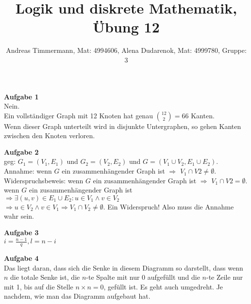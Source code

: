 \documentclass[a4paper]{scrartcl}
\title{Logik und diskrete Mathematik, Übung 12}
\author{Andreas Timmermann, Mat: 4994606, Alena Dudarenok, Mat: 4999780, Gruppe: 3}
\begin{document}
	\maketitle
	\begin{flushleft}
		\textbf{Aufgabe 1}\\
		Nein.\\
		Ein vollständiger Graph mit 12 Knoten hat genau $\binom{12}{2}=66$ Kanten.\\
		Wenn dieser Graph unterteilt wird in disjunkte Untergraphen, so gehen Kanten zwischen den Knoten verloren.\\
	\end{flushleft}
	\begin{flushleft}
		\textbf{Aufgabe 2}\\
		geg: $G_1=(V_1,E_1)$ und $G_2=(V_2,E_2)$ und $G=(V_1\cup V_2,E_1\cup E_2)$.\\
		Annahme: wenn $G$ ein zusammenhängender Graph ist $\Rightarrow$ $V_1\cap V2\neq \emptyset$.\\[1em]
		 Widerspruchsbeweis: wenn $G$ ein zusammenhängender Graph ist $\Rightarrow$ $V_1\cap V2=\emptyset$.\\
		 wenn $G$ ein zusammenhängender Graph ist $\Rightarrow \exists (u,v)\in E_1\cup E_2: u\in V_1 \wedge v\in V_2$\\
		 $\Rightarrow u\in V_2 \wedge v\in V_1 \Rightarrow V_1\cap V_2\neq \emptyset$. Ein Widerspruch! Also muss die Annahme wahr sein.\\[1em]
	\end{flushleft}
	\begin{flushleft}
		\textbf{Aufgabe 3}\\
		$i = \frac{n-1}{q}, l = n-i$\\[1em]
	\end{flushleft}
	\begin{flushleft}
		\textbf{Aufgabe 4}\\
		Das liegt daran, dass sich die Senke in diesem Diagramm so darstellt, dass wenn $n$ die totale Senke ist, die $n$-te Spalte mit nur 0 aufgefüllt und die $n$-te Zeile nur mit 1, bis auf die Stelle $n\times n = 0$, gefüllt ist. Es geht auch umgedreht. Je nachdem, wie man das Diagramm aufgebaut hat.
	\end{flushleft}
\end{document}
